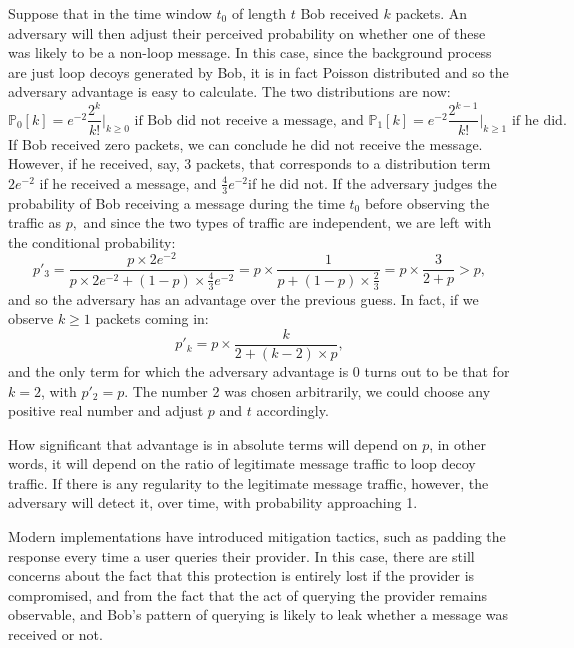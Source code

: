 \documentclass{article}
\begin{document}
Suppose that in the time window $t_0$ of length $t$ Bob received $k$ packets. An adversary will then adjust their perceived probability on whether one of these was likely to be a non-loop message. In this case, since the background process are just loop decoys generated by Bob, it is in fact Poisson distributed and so the adversary advantage is easy to calculate. The two distributions are now: $$\mathbb{P}_0[k]=e^{-2}\frac{2^k}{k!}\bigg|_{k\geq 0}\text{ if Bob did not receive a message, and }\mathbb{P}_1[k]=e^{-2}\frac{2^{k-1}}{k!}\bigg|_{k\geq 1}\text{ if he did.}$$ If Bob received zero packets, we can conclude he did not receive the message. However, if he received, say, 3 packets, that corresponds to a distribution term $2e^{-2}$ if he received a message, and $\frac{4}{3}e^{-2} $if he did not. If the adversary judges the probability of Bob receiving a message during the time $t_0$ before observing the traffic as $p,$ and since the two types of traffic are independent, we are left with the conditional probability: $$p'_3=\frac{p\times 2e^{-2}}{p\times 2e^{-2}+(1-p)\times\frac{4}{3}e^{-2}}=p\times \frac{1}{p+(1-p)\times \frac{2}{3}}=p\times\frac{3}{2+p}>p,$$ and so the adversary has an advantage over the previous guess. In fact, if we observe $k\geq 1$ packets coming in: $$p'_k=p\times \frac{k}{2+(k-2)\times p},$$ and the only term for which the adversary advantage is 0 turns out to be that for $k=2$, with $p'_2=p$. The number 2 was chosen arbitrarily, we could choose any positive real number and adjust $p$ and $t$ accordingly.


How significant that advantage is in absolute terms will depend on $p$, in other words, it will depend on the ratio of legitimate message traffic to loop decoy traffic. If there is any regularity to the legitimate message traffic, however, the adversary will detect it, over time, with probability approaching 1.

Modern implementations have introduced mitigation tactics, such as padding the response every time a user queries their provider. In this case, there are still concerns about the fact that this protection is entirely lost if the provider is compromised, and from the fact that the act of querying the provider remains observable, and Bob's pattern of querying is likely to leak whether a message was received or not. 
\end{document}
